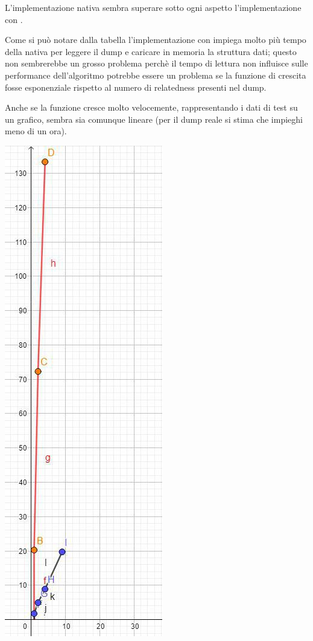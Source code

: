 L'implementazione nativa sembra superare sotto ogni aspetto l'implementazione con .

Come si può notare dalla tabella l'implementazione con  impiega molto più tempo della nativa per leggere il dump e caricare in memoria la struttura dati;
questo non sembrerebbe un grosso problema perchè il tempo di lettura non influisce sulle performance dell'algoritmo potrebbe essere un problema se la funzione di crescita 
fosse esponenziale rispetto al numero di relatedness presenti nel dump. 

Anche se la funzione cresce molto velocemente, rappresentando i dati di test su un grafico, sembra sia comunque lineare (per il dump reale si stima che impieghi meno di un ora).

\begin{center}
    \includegraphics[scale=0.55]{Sources/Img/c03_02.jpg}
\end{center}

